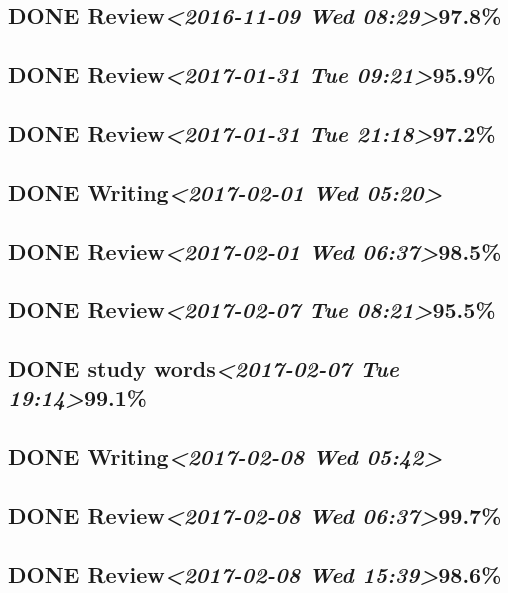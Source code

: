 \documentclass[11pt]{ctexart}
\begin{document}
\subsection{{\bfseries\sffamily DONE} Review\textit{<2016-11-09 Wed 08:29>}97.8\%}
\label{sec:orga95af0c}
\subsection{{\bfseries\sffamily DONE} Review\textit{<2017-01-31 Tue 09:21>}95.9\%}
\label{sec:orge1b3673}
\subsection{{\bfseries\sffamily DONE} Review\textit{<2017-01-31 Tue 21:18>}97.2\%}
\label{sec:orgb27c4bc}
\subsection{{\bfseries\sffamily DONE} Writing\textit{<2017-02-01 Wed 05:20>}}
\label{sec:orgfa180ac}
\subsection{{\bfseries\sffamily DONE} Review\textit{<2017-02-01 Wed 06:37>}98.5\%}
\label{sec:orgb0b898a}
\subsection{{\bfseries\sffamily DONE} Review\textit{<2017-02-07 Tue 08:21>}95.5\%}
\label{sec:org41ebcb8}
\subsection{{\bfseries\sffamily DONE} study words\textit{<2017-02-07 Tue 19:14>}99.1\%}
\label{sec:orge8961b9}
\subsection{{\bfseries\sffamily DONE} Writing\textit{<2017-02-08 Wed 05:42>}}
\label{sec:org8770bc7}
\subsection{{\bfseries\sffamily DONE} Review\textit{<2017-02-08 Wed 06:37>}99.7\%}
\label{sec:org95134aa}
\subsection{{\bfseries\sffamily DONE} Review\textit{<2017-02-08 Wed 15:39>}98.6\%}
\label{sec:org80b4dfb}
\end{document}
